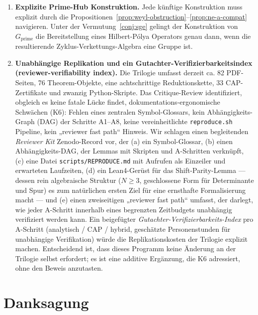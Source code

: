 \documentclass[11pt]{article}
\theoremstyle{definition}
\theoremstyle{remark}
\begin{document}
\begin{enumerate}
\item \textbf{Explizite Prime-Hub Konstruktion.} Jede künftige
  Konstruktion muss explizit durch die
  Propositionen~\ref{prop:weyl-obstruction}--\ref{prop:ne-a-compat} navigieren.
  Unter der Vermutung~\ref{conj:sge} gelingt der Konstruktion von
  $G_\mathrm{prime}$ die Bereitstellung eines Hilbert-P\'olya Operators
  genau dann, wenn die resultierende Zyklus-Verkettungs-Algebra eine Gruppe ist.

\item \textbf{Unabhängige Replikation und ein Gutachter-Verifizierbarkeitsindex (reviewer-verifiability index).}
  Die Trilogie \cite{Geiger2026RHII,Geiger2026RHIII}
  umfasst derzeit ca. 82 PDF-Seiten, 76 Theorem-Objekte, eine achtschrittige Reduktionskette, 33 CAP-Zertifikate und
  zwanzig Python-Skripte. Das Critique-Review
  \cite{RHCritiqueReview2026} identifiziert, obgleich es keine fatale Lücke findet,
  dokumentations-ergonomische Schwächen (K6): Fehlen eines
  zentralen Symbol-Glossars, kein Abhängigkeits-Graph (DAG) der Schritte A1--A8, keine vereinheitlichte
  \texttt{reproduce.sh} Pipeline, kein „reviewer fast path“ Hinweis.
  Wir schlagen einen begleitenden \emph{Reviewer Kit} Zenodo-Record vor,
  der (a) ein Symbol-Glossar, (b) einen Abhängigkeits-DAG, der
  Lemmas mit Skripten und A-Schritten verknüpft, (c) eine Datei
  \texttt{scripts/REPRODUCE.md} mit Aufrufen als Einzeiler und
  erwarteten Laufzeiten, (d) ein Lean4-Gerüst für das Shift-Parity-Lemma ---
  dessen rein algebraische Struktur ($N \geq 3$, geschlossene Form für Determinante und Spur) es zum natürlichen ersten Ziel
  für eine ernsthafte Formalisierung macht --- und (e) einen zweiseitigen „reviewer fast path“ umfasst, der darlegt, wie jeder A-Schritt innerhalb eines
  begrenzten Zeitbudgets unabhängig verifiziert werden kann. Ein beigefügter \emph{Gutachter-Verifizierbarkeits-Index} pro A-Schritt (analytisch / CAP / hybrid, geschätzte Personenstunden
  für unabhängige Verifikation) würde die Replikationskosten der Trilogie
  explizit machen. Entscheidend ist, dass dieses Programm keine
  Änderung an der Trilogie selbst erfordert; es ist eine additive Ergänzung, die
  K6 adressiert, ohne den Beweis anzutasten.
\end{enumerate}

\section*{Danksagung}
\end{document}
